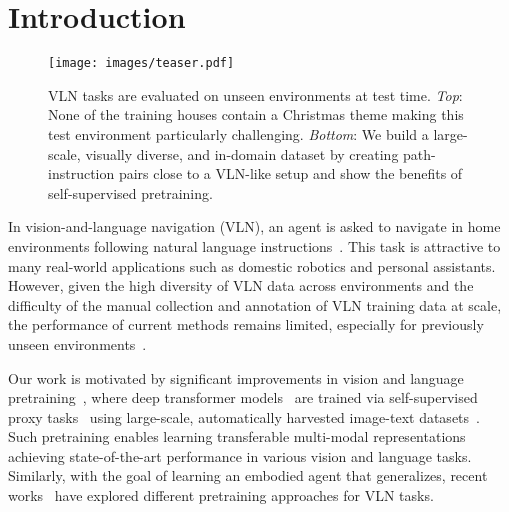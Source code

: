 \RequirePackage[dvipsnames,table]{xcolor} \documentclass[10pt,twocolumn,letterpaper]{article}
\begin{document}
 \section{Introduction}
\label{sec:intro}

\begin{figure}[t]
\centering
\texttt{[image: images/teaser.pdf]}
\vspace{-6mm}
\caption{VLN tasks are evaluated on unseen environments at test time.
\emph{Top}: None of the training houses contain a Christmas theme making this test environment particularly challenging.
\emph{Bottom}: We build a large-scale, visually diverse, and in-domain dataset by creating path-instruction pairs close to a VLN-like setup and show the benefits of self-supervised pretraining.}
\vspace{-5mm}
\label{fig:teaser}
\end{figure}


In vision-and-language navigation (VLN), an agent is asked to navigate in home environments following natural language instructions~\cite{anderson2018evaluation,anderson2018r2r}.
This task is attractive to many real-world applications such as domestic robotics and personal assistants.
However, given the high diversity of VLN data across environments and the difficulty of the manual collection and annotation of VLN training data at scale, the performance of current methods remains limited, especially for previously unseen environments~\cite{zhangdiagnosing}.



Our work is motivated by significant improvements in vision and language pretraining~\cite{alberti2019b2t2,chen2020uniter,li2020oscar,lu2019vilbert,lu2020_12in1,su2019vlbert}, where deep transformer models~\cite{vaswani2017attention} are trained via self-supervised proxy tasks~\cite{devlin2018bert} using large-scale, automatically harvested image-text datasets~\cite{ordonez2011sbu,ConceptualCaptions}.
Such pretraining enables learning transferable multi-modal representations achieving state-of-the-art performance in various vision and language tasks.
Similarly, with the goal of learning an embodied agent that generalizes, recent works~\cite{hao2020prevalent,huang2019transferable,li2019press,majumdar2020vlnbert} have explored different pretraining approaches for VLN tasks.
\end{document}
